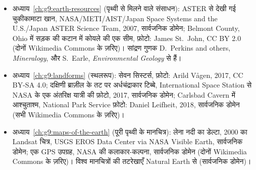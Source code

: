 \begin{itemize}
  \item अध्याय~\ref{ch:g9:earth-resources} (पृथ्वी से मिलने वाले संसाधन): ASTER से देखी गई चुकीकामाटा खान, NASA/METI/AIST/Japan Space Systems and the U.S./Japan ASTER Science Team, 2007, सार्वजनिक डोमेन; Belmont County, Ohio में सड़क की कटान में कोयले की एक सीम, फ़ोटो: James St.~John, CC BY 2.0 (दोनों Wikimedia Commons के ज़रिए)। सांद्रण गुणक D.~Perkins and others, \emph{Mineralogy}, और S.~Earle, \emph{Environmental Geology} से हैं।
  \item अध्याय~\ref{ch:g9:landforms} (स्थलरूप): सेवन सिस्टर्स, फ़ोटो: Arild Vågen, 2017, CC BY-SA 4.0; दक्षिणी ब्राज़ील के तट पर अर्धचंद्राकार टिब्बे, International Space Station से NASA के एक अंतरिक्ष यात्री की फ़ोटो, 2017, सार्वजनिक डोमेन; Carlsbad Cavern में आश्चुताश्म, National Park Service फ़ोटो: Daniel Leifheit, 2018, सार्वजनिक डोमेन (सभी Wikimedia Commons के ज़रिए)।
  \item अध्याय~\ref{ch:g9:maps-of-the-earth} (पूरी पृथ्वी के मानचित्र): लेना नदी का डेल्टा, 2000 का Landsat चित्र, USGS EROS Data Center via NASA Visible Earth, सार्वजनिक डोमेन; एक GPS उपग्रह, NASA की कलाकार-कल्पना, सार्वजनिक डोमेन (दोनों Wikimedia Commons के ज़रिए)। विश्व मानचित्रों की तटरेखाएँ Natural Earth से (सार्वजनिक डोमेन)।
\end{itemize}
